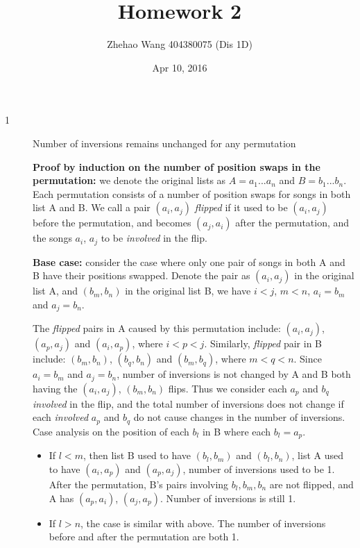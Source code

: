\documentclass{article}
\title{Homework 2}
\author{Zhehao Wang 404380075 (Dis 1D)}
\date{Apr 10, 2016}
\begin{document}
\maketitle

\begin{description}

\item[1]{Number of inversions remains unchanged for any permutation}
  
  \textbf{Proof by induction on the number of position swaps in the permutation:} we denote the original lists as $A = {a_1...a_n}$ and $B = {b_1...b_n}$. Each permutation consists of a number of position swaps for songs in both list A and B. We call a pair $(a_i, a_j)$ \textit{flipped} if it used to be $(a_i, a_j)$ before the permutation, and becomes $(a_j, a_i)$ after the permutation, and the songs $a_i$, $a_j$ to be \textit{involved} in the flip.

  \textbf{Base case:} consider the case where only one pair of songs in both A and B have their positions swapped. Denote the pair as $(a_i, a_j)$ in the original list A, and $(b_m, b_n)$ in the original list B, we have $i < j$, $m < n$, $a_i = b_m$ and $a_j = b_n$. 

  The \textit{flipped} pairs in A caused by this permutation include: $(a_i, a_j)$, $(a_p, a_j)$ and $(a_i, a_p)$, where $i < p < j$. Similarly, \textit{flipped} pair in B include: $(b_m, b_n)$, $(b_q, b_n)$ and $(b_m, b_q)$, where $m < q < n$. Since $a_i = b_m$ and $a_j = b_n$, number of inversions is not changed by A and B both having the $(a_i, a_j)$, $(b_m, b_n)$ flips. Thus we consider each $a_p$ and $b_q$ \textit{involved} in the flip, and the total number of inversions does not change if each \textit{involved} $a_p$ and $b_q$ do not cause changes in the number of inversions. Case analysis on the position of each $b_l$ in B where each $b_l = a_p$.
  
  \begin{itemize}
  \item
  If $l < m$, then list B used to have $(b_l, b_m)$ and $(b_l, b_n)$, list A used to have $(a_i, a_p)$ and $(a_p, a_j)$, number of inversions used to be 1. After the permutation, B's pairs involving $b_l, b_m, b_n$ are not flipped, and A has $(a_p, a_i)$, $(a_j, a_p)$. Number of inversions is still 1.

  \item
  If $l > n$, the case is similar with above. The number of inversions before and after the permutation are both 1.


\end{itemize}
\end{description}
\end{document}
